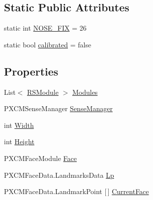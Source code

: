 \subsection*{Static Public Attributes}
\begin{DoxyCompactItemize}
\item 
static int \hyperlink{class_real_sense_1_1_model_a2f289c39689e5de8feeb82dcfb708170}{N\+O\+S\+E\+\_\+\+F\+IX} = 26
\item 
static bool \hyperlink{class_real_sense_1_1_model_af0a605c0cc3c8739836a4e98ac06b864}{calibrated} = false
\end{DoxyCompactItemize}
\subsection*{Properties}
\begin{DoxyCompactItemize}
\item 
List$<$ \hyperlink{class_real_sense_1_1_r_s_module}{R\+S\+Module} $>$ \hyperlink{class_real_sense_1_1_model_a9664e53331481e9cc45ad6d3540c218c}{Modules}
\item 
P\+X\+C\+M\+Sense\+Manager \hyperlink{class_real_sense_1_1_model_a396ec458576859184ac7e39d9be13465}{Sense\+Manager}
\item 
int \hyperlink{class_real_sense_1_1_model_a20e2b5bc79da762b436b75ddd28f63b7}{Width}
\item 
int \hyperlink{class_real_sense_1_1_model_abf6324c9f4acc3134909a239eff37a0a}{Height}
\item 
P\+X\+C\+M\+Face\+Module \hyperlink{class_real_sense_1_1_model_abb8701f1030ca1e3bfd226a9ad352da5}{Face}
\item 
P\+X\+C\+M\+Face\+Data.\+Landmarks\+Data \hyperlink{class_real_sense_1_1_model_a3e349d000d00015a340954ec3be977ea}{Lp}
\item 
P\+X\+C\+M\+Face\+Data.\+Landmark\+Point \mbox{[}$\,$\mbox{]} \hyperlink{class_real_sense_1_1_model_ad90fab8a6125b55803734ebbdcf1f83d}{Current\+Face}

\end{DoxyCompactItemize}

